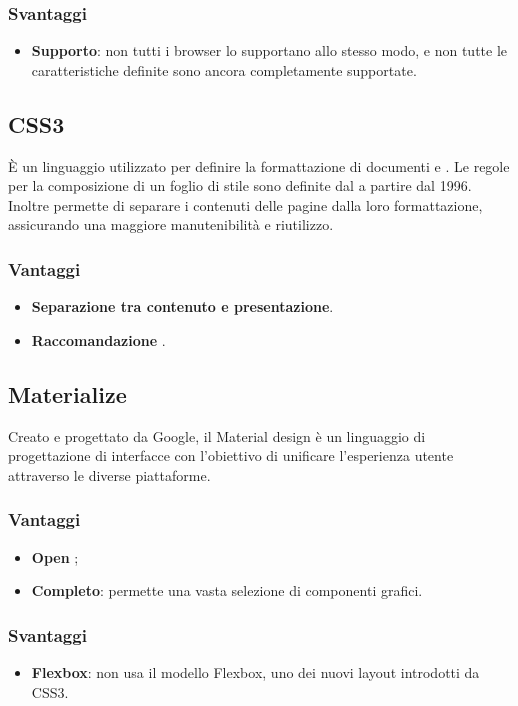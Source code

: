 \subsubsection{Svantaggi}
\begin{itemize}
\item \textbf{Supporto}: non tutti i browser lo supportano allo stesso modo, e non tutte le caratteristiche definite sono ancora completamente supportate.
\end{itemize}
\subsection{CSS3}
\`E un linguaggio utilizzato per definire la formattazione di documenti  e . Le regole per la composizione di un foglio di stile  sono definite dal  a partire dal 1996. Inoltre permette di separare i contenuti delle pagine  dalla loro formattazione, assicurando una maggiore manutenibilit\`a e riutilizzo.
\subsubsection{Vantaggi}
\begin{itemize}
\item \textbf{Separazione tra contenuto e presentazione}.
\item \textbf{Raccomandazione }.
\end{itemize}
\subsection{Materialize}
Creato e progettato da Google, il Material design è un linguaggio di progettazione di interfacce con l'obiettivo di unificare l'esperienza utente attraverso le diverse piattaforme.
\subsubsection{Vantaggi}
\begin{itemize}
\item \textbf{Open };
\item \textbf{Completo}: permette una vasta selezione di componenti grafici.
\end{itemize}
\subsubsection{Svantaggi}
\begin{itemize}
\item \textbf{Flexbox}: non usa il modello Flexbox, uno dei nuovi layout introdotti da CSS3.
\end{itemize}
